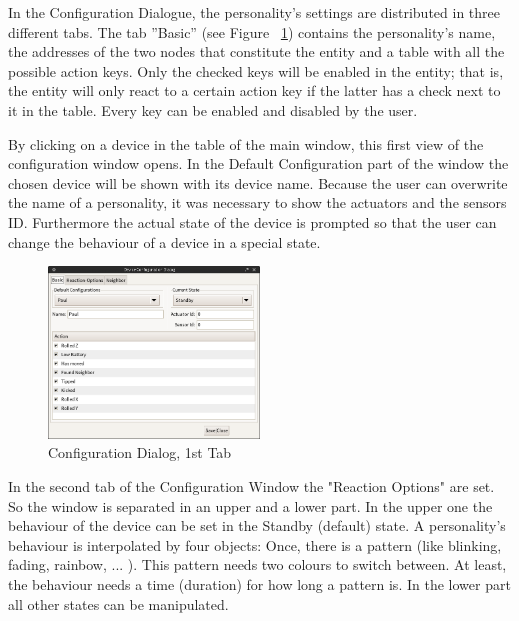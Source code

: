 In the Configuration Dialogue, the personality's settings are distributed in three different tabs. The tab ''Basic'' (see Figure ~\ref{fig:java-server-config01}) contains the personality's name, the addresses of the two nodes that constitute the entity and a table with all the possible action keys. Only the checked keys will be enabled in the entity; that is, the entity will only react to a certain action key if the latter has a check next to it in the table. Every key can be enabled and disabled by the user. 

By clicking on a device in the table of the main window, this first view of the configuration window opens. In the Default Configuration part of the window the chosen device will be shown with its device name. Because the user can overwrite the name of a personality, it was necessary to show the actuators and the sensors ID.
Furthermore the actual state of the device is prompted so that the user can change the behaviour of a device in a special state. 


\begin{figure}[h!]
 \centering
 \includegraphics[width= 0.5\textwidth, clip=true  ,keepaspectratio=true]{./pic/java-server-config01.png}
 \caption{Configuration Dialog, 1st Tab}
 \label{fig:java-server-config01}
\end{figure}

In the second tab of the Configuration Window the "Reaction Options" are set.
So the window is separated in an upper and a lower part. In the upper one the behaviour of the device can be set in the Standby (default) state. A personality's behaviour is interpolated by four objects: Once, there is a pattern (like blinking, fading, rainbow, ... ). This pattern needs two colours to switch between. At least, the behaviour needs a time (duration) for how long a pattern is.
In the lower part all other states can be manipulated.   


